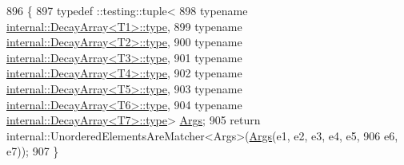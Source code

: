 {\begin{DoxyCode}
896                                               \{
897   typedef ::testing::tuple<
898       \textcolor{keyword}{typename} \hyperlink{namespaceupload_a4fc56f0dd6613be15c3c4dc3af3619ce}{internal::DecayArray<T1>::type},
899       \textcolor{keyword}{typename} \hyperlink{namespaceupload_a4fc56f0dd6613be15c3c4dc3af3619ce}{internal::DecayArray<T2>::type},
900       \textcolor{keyword}{typename} \hyperlink{namespaceupload_a4fc56f0dd6613be15c3c4dc3af3619ce}{internal::DecayArray<T3>::type},
901       \textcolor{keyword}{typename} \hyperlink{namespaceupload_a4fc56f0dd6613be15c3c4dc3af3619ce}{internal::DecayArray<T4>::type},
902       \textcolor{keyword}{typename} \hyperlink{namespaceupload_a4fc56f0dd6613be15c3c4dc3af3619ce}{internal::DecayArray<T5>::type},
903       \textcolor{keyword}{typename} \hyperlink{namespaceupload_a4fc56f0dd6613be15c3c4dc3af3619ce}{internal::DecayArray<T6>::type},
904       \textcolor{keyword}{typename} \hyperlink{namespaceupload_a4fc56f0dd6613be15c3c4dc3af3619ce}{internal::DecayArray<T7>::type}> 
      \hyperlink{namespacetesting_a09ac462e8d6ed468cbfaa9c767aee0aa}{Args};
905   \textcolor{keywordflow}{return} internal::UnorderedElementsAreMatcher<Args>(\hyperlink{namespacetesting_a09ac462e8d6ed468cbfaa9c767aee0aa}{Args}(e1, e2, e3, e4, e5,
906       e6, e7));
907 \}
\end{DoxyCode}
}
